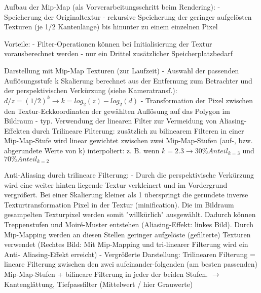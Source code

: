 \documentclass[10pt,landscape]{article}
\begin{document}
\begin{multicols}{3}
  Aufbau der Mip-Map (als Vorverarbeitungsschritt beim Rendering):
  - Speicherung der Originaltextur
  - rekursive Speicherung der geringer aufgelösten Texturen (je 1/2 Kantenlänge) bis hinunter zu einem einzelnen Pixel
  
  Vorteile:
  - Filter-Operationen können bei Initialisierung der Textur vorausberechnet werden
  - nur ein Drittel zusätzlicher Speicherplatzbedarf
  
  Darstellung mit Mip-Map Texturen (zur Laufzeit)
  - Auswahl der passenden Auflösungsstufe k Skalierung berechnet aus der Entfernung zum Betrachter und der perspektivischen Verkürzung (siehe Kameratransf.): $d/z = (1/2)^k \rightarrow k = log_2(z)-log_2(d)$
  - Transformation der Pixel zwischen den Textur-Eckkoordinaten der gewählten Auflösung auf das Polygon im Bildraum
  - typ. Verwendung der linearen Filter zur Vermeidung von Aliasing-Effekten durch Trilineare Filterung: zusätzlich zu bilinearem Filteren in einer Mip-Map-Stufe wird linear gewichtet zwischen zwei Mip-Map-Stufen (auf-, bzw. abgerundete Werte von k) interpoliert: z. B. wenn $k = 2.3 \rightarrow 30\% Anteil_{k=3}$ und $70\% Anteil_{k=2}$
  
  
  Anti-Aliasing durch trilineare Filterung:
  - Durch die perspektivische Verkürzung wird eine weiter hinten liegende Textur verkleinert und im Vordergrund vergrößert. Bei einer Skalierung kleiner als 1 überspringt die gerundete inverse Texturtransformation Pixel in der Textur (minification). Die im Bildraum gesampelten Texturpixel werden somit "willkürlich" ausgewählt. Dadurch können Treppenstufen und Moiré-Muster entstehen (Aliasing-Effekt: linkes Bild). Durch Mip-Mapping werden an diesen Stellen geringer aufgelöste (gefilterte) Texturen verwendet (Rechtes Bild: Mit Mip-Mapping und tri-linearer Filterung wird ein Anti- Aliasing-Effekt erreicht)
  - Vergrößerte Darstellung: Trilinearen Filterung = lineare Filterung zwischen den zwei aufeinander-folgenden (am besten passenden) Mip-Map-Stufen + bilineare Filterung in jeder der beiden Stufen. $\rightarrow$ Kantenglättung, Tiefpassfilter (Mittelwert / hier Grauwerte)
  
  

\end{multicols}
\end{document}
